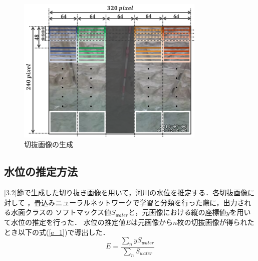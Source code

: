 \vspace{2mm}
\begin{figure}[h] 
  \begin{center}
    \includegraphics[width=90mm]{figs/kirinuki.png}
  \end{center}
  \caption{切抜画像の生成}
  \label{kirinuki}
\end{figure}

\clearpage
  
\label{3.3}
\subsection{水位の推定方法}
\ref{3.2}節で生成した切り抜き画像を用いて，河川の水位を推定する．各切抜画像に対して
，畳込みニューラルネットワークで学習と分類を行った際に，出力される水面クラスの
ソフトマックス値$S_{water}$と，元画像における縦の座標値$y$を用いて水位の推定を行った．
水位の推定値$E$は元画像から$n$枚の切抜画像が得られたとき以下の式(\ref{e_1})で導出した．
\vspace{5mm}
\begin{equation}
  \label{e_1}
  E=\frac{\sum_{n} y S_{water}}{\sum_{n} S_{water}}
\end{equation}
\vspace{3mm}

